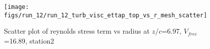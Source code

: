 \begin{figure}[H]
\centering
\texttt{[image: figs/run\_12/run\_12\_turb\_visc\_ettap\_top\_vs\_r\_mesh\_scatter]}
\caption{Scatter plot of reynolds stress term vs radius at $z/c$=6.97, $V_{free}$=16.89, station2}
\label{fig:run_12_turb_visc_ettap_top_vs_r_mesh_scatter}
\end{figure}


